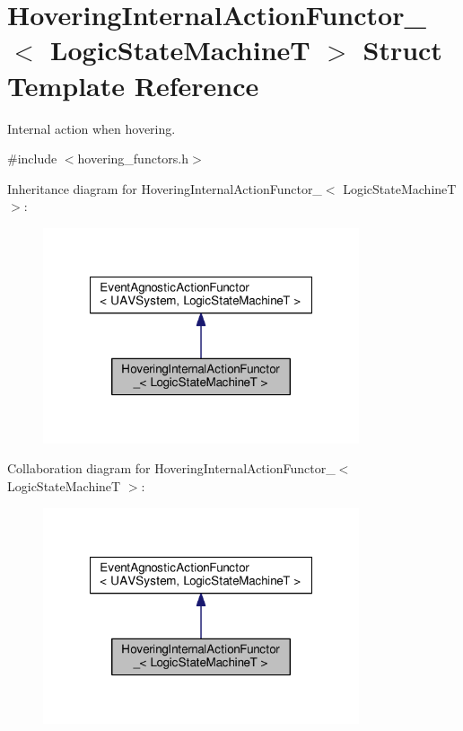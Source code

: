 \hypertarget{structHoveringInternalActionFunctor__}{\section{Hovering\-Internal\-Action\-Functor\-\_\-$<$ Logic\-State\-Machine\-T $>$ Struct Template Reference}
\label{structHoveringInternalActionFunctor__}
}


Internal action when hovering.  




{\ttfamily \#include $<$hovering\-\_\-functors.\-h$>$}



Inheritance diagram for Hovering\-Internal\-Action\-Functor\-\_\-$<$ Logic\-State\-Machine\-T $>$\-:\nopagebreak
\begin{figure}[H]
\begin{center}
\leavevmode
\includegraphics[width=264pt]{structHoveringInternalActionFunctor____inherit__graph}
\end{center}
\end{figure}


Collaboration diagram for Hovering\-Internal\-Action\-Functor\-\_\-$<$ Logic\-State\-Machine\-T $>$\-:\nopagebreak
\begin{figure}[H]
\begin{center}
\leavevmode
\includegraphics[width=264pt]{structHoveringInternalActionFunctor____coll__graph}
\end{center}
\end{figure}
